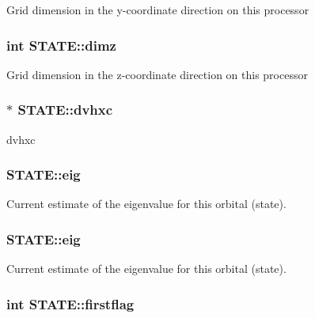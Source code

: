 Grid dimension in the y-\/coordinate direction on this processor \hypertarget{struct_s_t_a_t_e_a712219672f91bd38a3eb3bed2627d841}{
\subsubsection[{dimz}]{\setlength{\rightskip}{0pt plus 5cm}int S\-T\-A\-T\-E\-::dimz}}\label{struct_s_t_a_t_e_a712219672f91bd38a3eb3bed2627d841}
Grid dimension in the z-\/coordinate direction on this processor \hypertarget{struct_s_t_a_t_e_aef32578557b34abb497d30fe93fb4ecb}{
\subsubsection[{dvhxc}]{$\ast$ S\-T\-A\-T\-E\-::dvhxc}}\label{struct_s_t_a_t_e_aef32578557b34abb497d30fe93fb4ecb}
dvhxc \hypertarget{struct_s_t_a_t_e_ad0c244fac6ef4c7d1e5b5502e6b1335c}{
\subsubsection[{eig}]{ S\-T\-A\-T\-E\-::eig}}\label{struct_s_t_a_t_e_ad0c244fac6ef4c7d1e5b5502e6b1335c}
Current estimate of the eigenvalue for this orbital (state). \hypertarget{struct_s_t_a_t_e_a0cc8784bd18294dcb1b0dd47db110d76}{
\subsubsection[{eig}]{ S\-T\-A\-T\-E\-::eig}}\label{struct_s_t_a_t_e_a0cc8784bd18294dcb1b0dd47db110d76}
Current estimate of the eigenvalue for this orbital (state). \hypertarget{struct_s_t_a_t_e_abbd327a27b5199d890feacb6c5753360}{
\subsubsection[{firstflag}]{\setlength{\rightskip}{0pt plus 5cm}int S\-T\-A\-T\-E\-::firstflag}}\label{struct_s_t_a_t_e_abbd327a27b5199d890feacb6c5753360}
